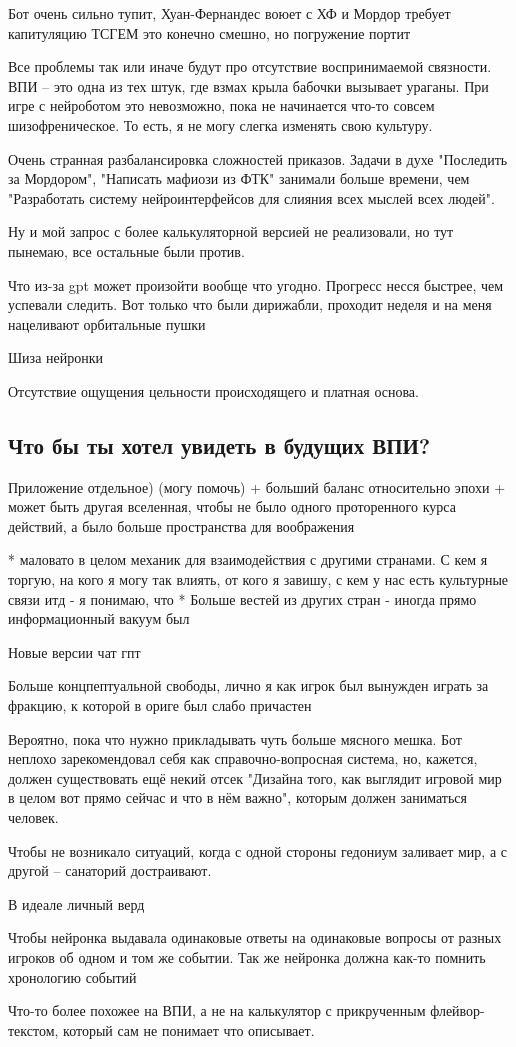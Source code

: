 Бот очень сильно тупит, Хуан-Фернандес воюет с ХФ и Мордор требует капитуляцию ТСГЕМ это конечно смешно, но погружение портит

Все проблемы так или иначе будут про отсутствие воспринимаемой связности. ВПИ -- это одна из тех штук, где взмах крыла бабочки вызывает ураганы. При игре с нейроботом это невозможно, пока не начинается что-то совсем шизофреническое. То есть, я не могу слегка изменять свою культуру.

Очень странная разбалансировка сложностей приказов. Задачи в духе "Последить за Мордором", "Написать мафиози из ФТК" занимали больше времени, чем "Разработать систему нейроинтерфейсов для слияния всех мыслей всех людей".

Ну и мой запрос с более калькуляторной версией не реализовали, но тут пынемаю, все остальные были против.

Что из-за gpt может произойти вообще что угодно. Прогресс несся быстрее, чем успевали следить. Вот только что были дирижабли, проходит неделя и на меня нацеливают орбитальные пушки

Шиза нейронки

Отсутствие ощущения цельности происходящего и платная основа.

\subsection*{Что бы ты хотел увидеть в будущих ВПИ?}
Приложение отдельное) (могу помочь)
+ больший баланс относительно эпохи
+ может быть другая вселенная, чтобы не было одного проторенного курса действий, а было больше пространства для воображения

* маловато в целом механик для взаимодействия с другими странами. С кем я торгую, на кого я могу так влиять, от кого я завишу, с кем у нас есть культурные связи итд - я понимаю, что
* Больше вестей из других стран - иногда прямо информационный вакуум был

Новые версии чат гпт

Больше концпептуальной свободы, лично я как игрок был вынужден играть за фракцию, к которой в ориге был слабо причастен

Вероятно, пока что нужно прикладывать чуть больше мясного мешка. Бот неплохо зарекомендовал себя как справочно-вопросная система, но, кажется, должен существовать ещё некий отсек "Дизайна того, как выглядит игровой мир в целом вот прямо сейчас и что в нём важно", которым должен заниматься человек.

Чтобы не возникало ситуаций, когда с одной стороны гедониум заливает мир, а с другой -- санаторий достраивают.

В идеале личный верд

Чтобы нейронка выдавала одинаковые ответы на одинаковые вопросы от разных игроков об одном и том же событии. Так же нейронка должна как-то помнить хронологию событий

Что-то более похожее на ВПИ, а не на калькулятор с прикрученным флейвор-текстом, который сам не понимает что описывает.
